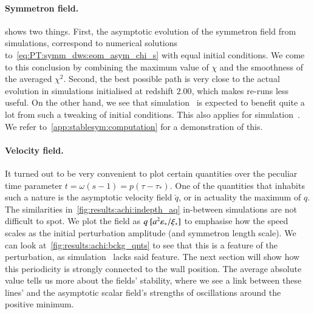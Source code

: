 \paragraph{Symmetron field.} %
 shows two things. First, the asymptotic evolution of the symmetron field from simulations, correspond to numerical solutions to~\cref{eq:PT:symm_dws:eom_asym_chi_s} with equal initial conditions. We come to this conclusion by combining the maximum value of $\chi$ and the smoothness of the averaged $\chi^2$. Second, the best possible path %
is very close to the actual evolution in simulations initialised at redshift $2.00$, which makes re-runs less useful. On the other hand, we see that simulation~ is expected to benefit quite a lot from such a tweaking of initial conditions. This also applies for simulation~. We refer to~\cref{app:stablesym:computation} for a demonstration of this.


\paragraph{Velocity field.} %
It turned out to be very convenient to plot certain quantities over the peculiar time parameter $t = \omega(s-1)=p(\tau-\tau_\ast)$. One of the quantities that inhabits such a nature is the asymptotic velocity field $\breve{q}$, or in actuality the maximum of $q$. %
The similarities in~\cref{fig:results:achi:indepth_aq} in-between simulations are not difficult to spot. We plot the field as $q~[a^2 \varepsilon_\ast/\xi_\ast]$ %
to emphasise how the speed scales as the initial perturbation amplitude (and symmetron length scale). We can look at~\cref{fig:results:achi:bckg_qnts} to see that this is a feature of the perturbation, as simulation~ lacks said feature. The next section will show how this periodicity is strongly connected to the wall position. The average absolute value tells us more about the fields' stability, where we see a link between these lines' and the asymptotic scalar field's strengths of oscillations around the positive minimum.






